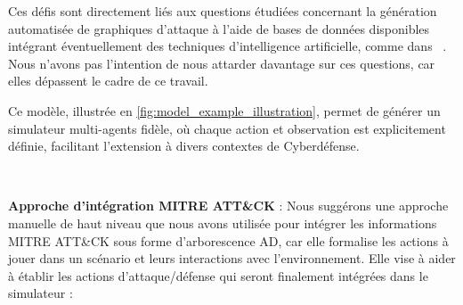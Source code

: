 Ces défis sont directement liés aux questions étudiées concernant la génération automatisée de graphiques d'attaque à l'aide de bases de données disponibles intégrant éventuellement des techniques d'intelligence artificielle, comme dans ~\cite{GFalco2018}. Nous n'avons pas l'intention de nous attarder davantage sur ces questions, car elles dépassent le cadre de ce travail.

Ce modèle, illustrée en \autoref{fig:model_example_illustration}, permet de générer un simulateur multi-agents fidèle, où chaque action et observation est explicitement définie, facilitant l'extension à divers contextes de Cyberdéfense.

\

\noindent
\textbf{Approche d'intégration MITRE ATT\&CK} : Nous suggérons une approche manuelle de haut niveau que nous avons utilisée pour intégrer les informations MITRE ATT\&CK sous forme d'arborescence AD, car elle formalise les actions à jouer dans un scénario et leurs interactions avec l'environnement. Elle vise à aider à établir les actions d'attaque/défense qui seront finalement intégrées dans le simulateur :
%
